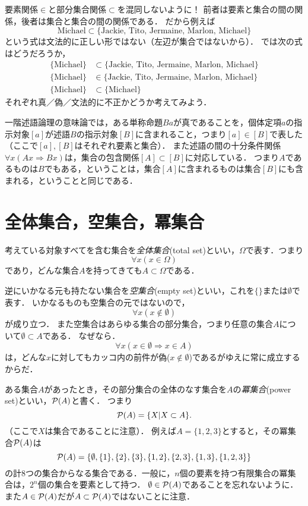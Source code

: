 \documentclass[11pt,a4paper]{jsarticle}
\begin{document}
\begin{attn}
要素関係$\in$と部分集合関係$\subset$を混同しないように！
前者は要素と集合の間の関係，後者は集合と集合の間の関係である．
だから例えば
\[
\text{Michael} \subset \{ \text{Jackie, Tito, Jermaine, Marlon, Michael}\}  
\]
という式は文法的に正しい形ではない（左辺が集合ではないから）．
では次の式はどうだろうか，
\begin{align*}
\{ \text{Michael} \} &\subset \{ \text{Jackie, Tito, Jermaine, Marlon, Michael}\}  \\
\{ \text{Michael} \} &\in \{ \text{Jackie, Tito, Jermaine, Marlon, Michael}\}  \\
\{ \text{Michael} \} &\subset \{ \text{Michael}\}  
\end{align*}
それぞれ真／偽／文法的に不正かどうか考えてみよう．
\end{attn}


\begin{example}
一階述語論理の意味論では，ある単称命題$Ba$が真であることを，個体定項$a$の指示対象$[a]$が述語$B$の指示対象$[B]$に含まれること，つまり$[a] \in [B]$で表した（ここで$[a], [B]$はそれぞれ要素と集合）．
また述語の間の十分条件関係$\forall x (Ax \Rightarrow Bx)$は，集合の包含関係$[A] \subset [B]$に対応している．
つまり$A$であるものは$B$でもある，ということは，集合$[A]$に含まれるものは集合$[B]$にも含まれる，ということと同じである．
\end{example}


\section{全体集合，空集合，冪集合}
考えている対象すべてを含む集合を\emph{全体集合}(total set)といい，$\Omega$で表す．つまり
\[
\forall x (x \in \Omega)
\]
であり，どんな集合$A$を持ってきても$A \subset \Omega$である．

逆にいかなる元も持たない集合を\emph{空集合}(empty set)といい，これを$\{\}$または$\emptyset$で表す．
いかなるものも空集合の元ではないので，
\[
\forall x (x \not\in \emptyset)
\]
が成り立つ．
また空集合はあらゆる集合の部分集合，つまり任意の集合$A$について$\emptyset \subset A$である．
なぜなら．
\[
\forall x (x \in \emptyset \Rightarrow x \in A)
\]
は，どんな$x$に対してもカッコ内の前件が偽($x \not\in \emptyset$)であるがゆえに常に成立するからだ．

ある集合$A$があったとき，その部分集合の全体のなす集合を$A$の\emph{冪集合}(power set)といい，$\mathcal{P}(A)$と書く．
つまり
\[
 \mathcal{P}(A) = \{ X| X \subset A \}.
\]
（ここで$X$は集合であることに注意）．
例えば$A = \{1, 2, 3\}$とすると，その冪集合$\mathcal{P}(A)$は
\[
 \mathcal{P}(A) = \{ \emptyset, \{1\}, \{2\}, \{3\}, \{1,2\}, \{2,3\}, \{1,3\}, \{1,2,3\} \}
\]
の計8つの集合からなる集合である．一般に，$n$個の要素を持つ有限集合の冪集合は，$2^n$個の集合を要素として持つ．
$\emptyset \in \mathcal{P}(A)$であることを忘れないように．
また$A \in \mathcal{P}(A)$だが$A \subset \mathcal{P}(A)$ではないことに注意．
\end{document}
